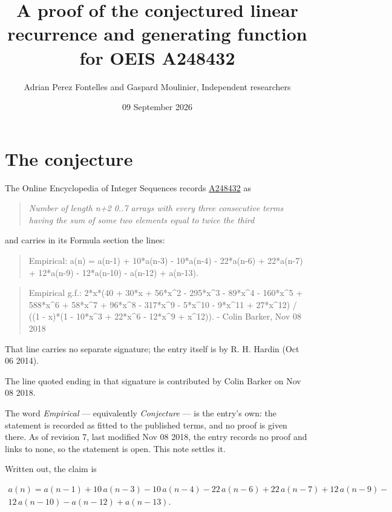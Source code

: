 \documentclass[11pt]{article}
\title{A proof of the conjectured linear recurrence and generating function for OEIS A248432}
\author{Adrian Perez Fontelles and Gaspard Moulinier, Independent researchers}
\date{09 September 2026}
\theoremstyle{definition}
\begin{document}
\maketitle
\section{The conjecture}

The Online Encyclopedia of Integer Sequences records \href{https://oeis.org/A248432}{A248432} as

\begin{quote}\itshape Number of length n+2 0..7 arrays with every three consecutive terms having the sum of some two elements equal to twice the third\end{quote}

and carries in its Formula section the lines:

\begin{quote}\ttfamily Empirical: a(n) = a(n-1) + 10*a(n-3) - 10*a(n-4) - 22*a(n-6) + 22*a(n-7) + 12*a(n-9) - 12*a(n-10) - a(n-12) + a(n-13).\end{quote}

\begin{quote}\ttfamily Empirical g.f.: 2*x*(40 + 30*x + 56*x\textasciicircum{}2 - 295*x\textasciicircum{}3 - 89*x\textasciicircum{}4 - 160*x\textasciicircum{}5 + 588*x\textasciicircum{}6 + 58*x\textasciicircum{}7 + 96*x\textasciicircum{}8 - 317*x\textasciicircum{}9 - 5*x\textasciicircum{}10 - 9*x\textasciicircum{}11 + 27*x\textasciicircum{}12) / ((1 - x)*(1 - 10*x\textasciicircum{}3 + 22*x\textasciicircum{}6 - 12*x\textasciicircum{}9 + x\textasciicircum{}12)). -  Colin Barker, Nov 08 2018\end{quote}

That line carries no separate signature; the entry itself is by R. H. Hardin (Oct 06 2014).

The line quoted ending in that signature is contributed by Colin Barker on Nov 08 2018.

The word {\itshape Empirical} --- equivalently {\itshape Conjecture} --- is the entry's own: the statement is recorded as fitted to the published terms, and no proof is given there. As of revision 7, last modified Nov 08 2018, the entry records no proof and links to none, so the statement is open. This note settles it.

Written out, the claim is

\begin{multline*} a(n) = a(n-1) + 10\,a(n-3) - 10\,a(n-4) - 22\,a(n-6) + 22\,a(n-7) + 12\,a(n-9) - \\ 12\,a(n-10) - a(n-12) + a(n-13). \end{multline*}
\end{document}
